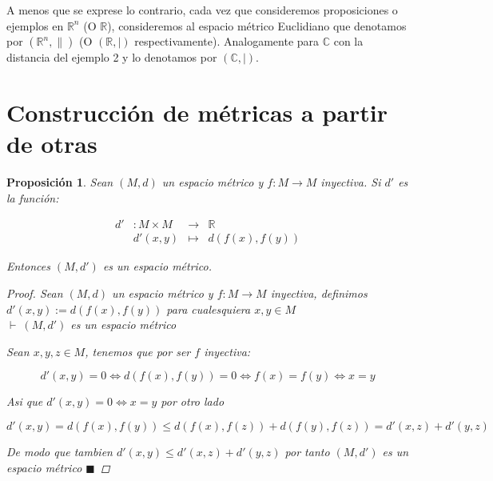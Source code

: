 \documentclass[oneside]{book} %
\theoremstyle{Teorema}
\newtheorem{Proposicion}[Definicion]{Proposición}
\theoremstyle{Ejemplos}
\theoremstyle{[Obs]}
\newcommand{\absSymbol}{\left|\right.} %
\newcommand{\normSymbol}{\lVert} %
\renewcommand{\{}{\left\lbrace} %
\renewcommand{\}}{\right\rbrace} %
\newcommand{\R}{\mathbb{R}} %
\newcommand{\C}{\mathbb{C}} %
\newcommand{\Rn}{\mathbb{R}^n} %
\renewcommand{\qed}{$\blacksquare$} %
\newcommand{\pd}{$\vdash\ $} %
\begin{document}
			\noindent A menos que se exprese lo contrario, cada vez que consideremos proposiciones o ejemplos en $\Rn$ (O $\R$), consideremos al espacio métrico Euclidiano que denotamos por $(\Rn, \normSymbol)$ (O $(\R, \absSymbol)$ respectivamente). Analogamente para $\C$ con la distancia del ejemplo 2 y lo denotamos por $(\C, \absSymbol)$. 

		\section{Construcción de métricas a partir de otras}

			\begin{Proposicion}\setlength{\parindent}{0em}

				Sean $(M, d)$ un espacio métrico y $f : M \to M$ inyectiva. Si $d'$ es la función: 

				\[\begin{matrix}
						
					d' & : M \times M & \to & \R \\

					& d'(x, y) & \mapsto & d(f(x), f(y)) 

				\end{matrix} \] 

				Entonces $(M, d')$ es un espacio métrico.

				\begin{proof}
					
					Sean $(M, d)$ un espacio métrico y $f : M \to M$ inyectiva, definimos $d'(x, y) := d(f(x), f(y))$ para cualesquiera $x, y \in M$ \\
					\pd $(M, d')$ es un espacio métrico 

					Sean $x, y, z \in M$, tenemos que por ser $f$ inyectiva:

					\[ d'(x, y) = 0 \Leftrightarrow d(f(x), f(y)) = 0 \Leftrightarrow f(x) = f(y) \Leftrightarrow x = y \]

					Asi que $d'(x, y) = 0 \Leftrightarrow x = y$ por otro lado

					\[ d'(x, y) = d(f(x), f(y)) \leq d(f(x), f(z)) + d(f(y), f(z)) = d'(x, z) + d'(y, z) \]

					De modo que tambien $d'(x, y) \leq d'(x, z) + d'(y, z)$ por tanto $(M, d')$ es un espacio métrico \qed

				\end{proof}

			\end{Proposicion}
\end{document}
